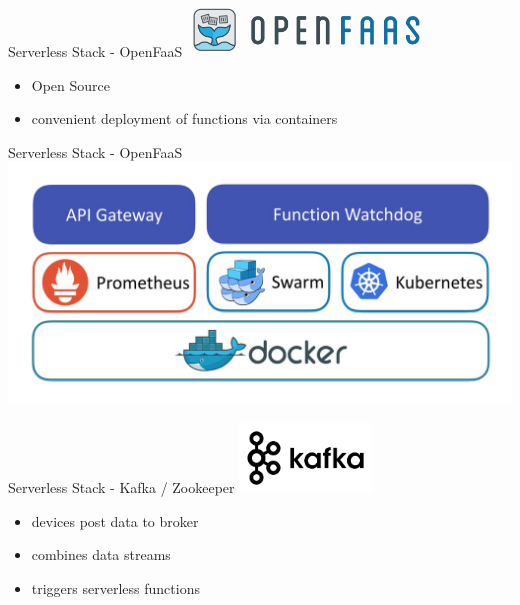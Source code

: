 \documentclass[aspectratio=1610]{beamer}
\begin{document}
  \begin{frame}{Serverless Stack - OpenFaaS}
    \includegraphics[height=4em]{openfaas-logo}

    \vspace*{2em}

    \begin{itemize}
      \item Open Source
      \item convenient deployment of functions via containers
    \end{itemize}
  \end{frame}

  \begin{frame}{Serverless Stack - OpenFaaS}
    \includegraphics[width=\textwidth]{openfaas-stack}
  \end{frame}

  \begin{frame}{Serverless Stack - Kafka / Zookeeper}
    \includegraphics[height=5em]{kafka-logo}

    \vspace*{1.5em}

    \begin{itemize}
      \item devices post data to broker
      \item combines data streams
      \item triggers serverless functions
    \end{itemize}
  \end{frame}
\end{document}
